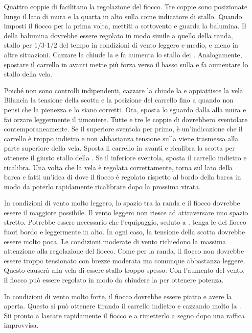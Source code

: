 Quattro coppie di \telltales facilitano la regolazione del fiocco. Tre coppie
sono posizionate lungo il lato di mura e la quarta in alto sulla \leech come
indicatore di stallo. Quando imposti il fiocco per la prima volta, mettiti a
sottovento e guarda la balumina. Il \telltale della balumina dovrebbe essere
regolato in modo simile a quello della randa, stallo per $1/3$-$1/2$ del tempo
in condizioni di vento leggero e medio, e meno in altre situazioni. Cazzare la
\sheet chiude la \leech e fa aumenta lo stallo dei \telltales. Analogamente,
spostare il carrello in avanti mette più forza verso il basso sulla \leech e
fa aumentare lo stallo della vela.

Poiché non sono controlli indipendenti, cazzare la \sheet chiude la \leech e
appiattisce la vela. Bilancia la tensione della scotta e la posizione del
carrello fino a quando non pensi che la pienezza e lo \twist siano corretti.
Ora, sposta lo sguardo dalla \leech alla mura e fai orzare leggermente il
timoniere. Tutte e tre le coppie di \telltales dovrebbero sventolare
contemporaneamente. Se il \telltale superiore sventola per primo, è
un'indicazione che il carrello è troppo indietro e non abbastanza tensione sulla
\sheet viene trasmessa alla parte superiore della vela. Sposta il carrello in
avanti e ricalibra la scotta per ottenere il giusto stallo della \leech. Se il
\telltale inferiore sventola, sposta il carrello indietro e ricalibra. Una volta
che la vela è regolata correttamente, torna sul lato \windward della barca e
fatti un'idea di dove il fiocco è regolato rispetto al bordo della barca in modo
da poterlo rapidamente ricalibrare dopo la prossima virata.

In condizioni di vento molto leggero, lo spazio tra la randa e il fiocco
dovrebbe essere il maggiore possibile. Il vento leggero non riesce ad
attraversare uno spazio stretto. Potrebbe essere necessario che l'equipaggio,
seduto a \leeward, tenga le \sheets del fiocco fuori bordo e leggermente in
alto. In ogni caso, la tensione della scotta dovrebbe essere molto poca. Le
condizioni moderate di vento richiedono la massima attenzione alla regolazione
del fiocco. Come per la randa, il fiocco non dovrebbe essere troppo tensionato
con brezze moderata ma comunque abbastanza leggere. Questo causerà alla vela di
essere stallo troppo spesso. Con l'aumento del vento, il fiocco può essere
regolato in modo da chiudere la \leech per ottenere potenza.

In condizioni di vento molto forte, il fiocco dovrebbe essere piatto e avere la
\leech aperta. Questo si può ottenere tirando il carrello indietro e cazzando
molto la \sheet. Sii pronto a lascare rapidamente il fiocco e a rimetterlo a
segno dopo una raffica improvvisa.